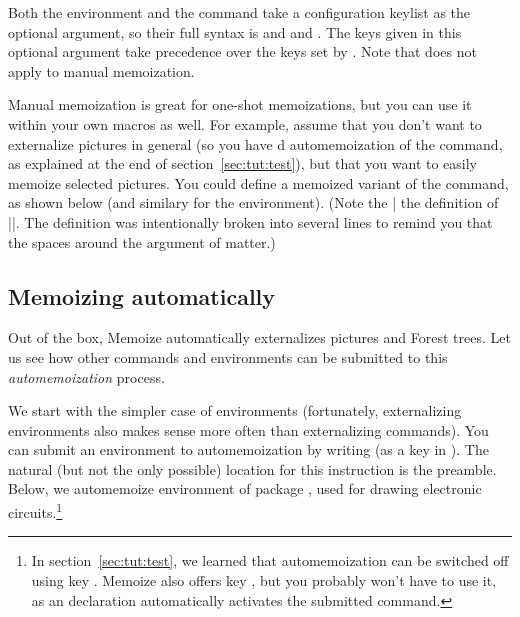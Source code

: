 \documentclass[a4paper,11pt]{article}
\begin{document}

Both the  environment and the  command take a
configuration keylist as the optional argument, so their full syntax is
 and and
.  The keys given in
this optional argument take precedence over the keys set by .
Note that  does not apply to manual memoization.

Manual memoization is great for one-shot memoizations, but you can use it
within your own macros as well.  For example, assume that you don't want to
externalize \TikZ pictures in general (so you have d
automemoization of the  command, as explained at the end of
section~\ref{sec:tut:test}), but that you want to easily memoize selected
pictures.  You could define a memoized variant of the  command, as shown
below (and similary for the environment).  (Note the |%
the definition of |\mmztikz|.  The definition was intentionally broken into
several lines to remind you that the spaces around the argument of 
matter.)


\clearpage
\subsection{Memoizing automatically}
\label{sec:tut:automemoization}

Out of the box, Memoize automatically externalizes \TikZ pictures and Forest
trees.  Let us see how other commands and environments can be submitted to this
\emph{automemoization} process.

We start with the simpler case of environments (fortunately, externalizing
environments also makes sense more often than externalizing commands).  You can
submit an environment to automemoization by writing
 (as
a key in ).  The natural (but not the only possible) location
for this instruction is the preamble.  Below, we automemoize environment
 of package , used for drawing electronic
circuits.\footnote{In section~\ref{sec:tut:test}, we learned that
  automemoization can be switched off using key .  Memoize
  also offers key , but you probably won't have to use it, as
  an  declaration automatically activates the submitted command.}
\end{document}
